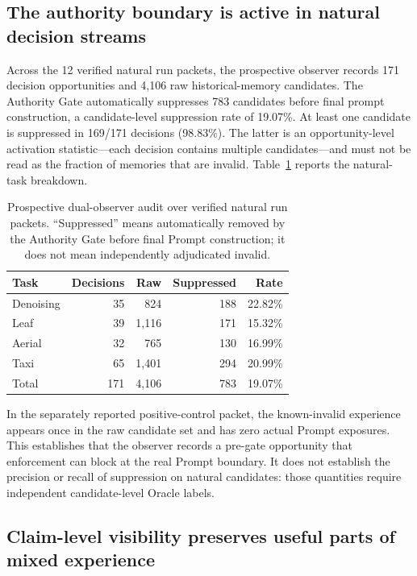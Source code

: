 \documentclass{article}
\begin{document}
\subsection{The authority boundary is active in natural decision streams}
\label{sec:prospective-prevalence}

Across the 12 verified natural run packets, the prospective observer records
171 decision opportunities and 4,106 raw historical-memory candidates.  The
Authority Gate automatically suppresses 783 candidates before final prompt
construction, a candidate-level suppression rate of 19.07\%.  At least one
candidate is suppressed in 169/171 decisions (98.83\%).  The latter is an
opportunity-level activation statistic---each decision contains multiple
candidates---and must not be read as the fraction of memories that are invalid.
Table~\ref{tab:prospective-prevalence} reports the natural-task breakdown.

\begin{table}[t]
\caption{Prospective dual-observer audit over verified natural run packets.
``Suppressed'' means automatically removed by the Authority Gate before final
Prompt construction; it does not mean independently adjudicated invalid.}
\label{tab:prospective-prevalence}
\centering
\small
\begin{tabular}{lrrrr}
\toprule
Task & Decisions & Raw & Suppressed & Rate \\
\midrule
Denoising & 35 & 824 & 188 & 22.82\% \\
Leaf      & 39 & 1,116 & 171 & 15.32\% \\
Aerial    & 32 & 765 & 130 & 16.99\% \\
Taxi      & 65 & 1,401 & 294 & 20.99\% \\
\midrule
Total     & 171 & 4,106 & 783 & 19.07\% \\
\bottomrule
\end{tabular}
\end{table}

In the separately reported positive-control packet, the known-invalid
experience appears once in the raw candidate set and has zero actual Prompt
exposures.  This establishes that the observer records a pre-gate opportunity
that enforcement can block at the real Prompt boundary.  It does not establish
the precision or recall of suppression on natural candidates: those quantities
require independent candidate-level Oracle labels.

\subsection{Claim-level visibility preserves useful parts of mixed experience}
\end{document}

